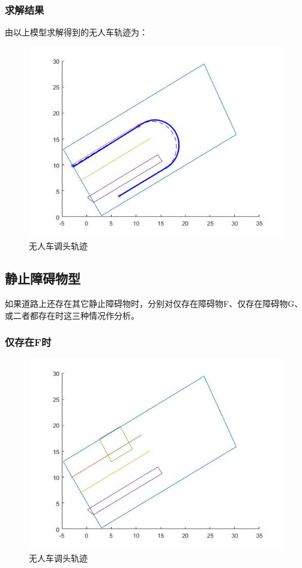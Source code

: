 \documentclass{article}
\begin{document}
\subsubsection{求解结果}
由以上模型求解得到的无人车轨迹为：
\begin{figure}[h]
    \centering
    \includegraphics[scale=0.4]{10.jpg}
    \caption{无人车调头轨迹}
\end{figure}

\subsection{静止障碍物型}
如果道路上还存在其它静止障碍物时，分别对仅存在障碍物F、仅存在障碍物G、或二者都存在时这三种情况作分析。

\subsubsection{仅存在F时}
\begin{figure}[h]
    \centering
    \includegraphics[scale=0.4]{11.jpg}
    \caption{无人车调头轨迹}
\end{figure}
\end{document}
